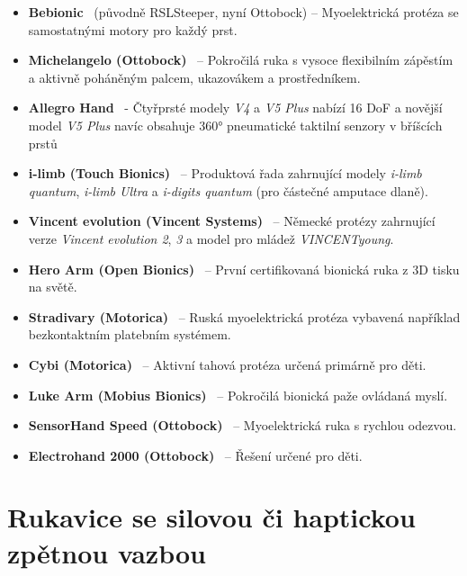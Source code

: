 \documentclass[FZS,DP]{tulthesis}
\begin{document}
\begin{itemize}
    \item \textbf{Bebionic}~\cite{Najman2017,Brazdil2020,Nyrobtseva2018,Thomas2023110,Ninu2014} (původně RSLSteeper, nyní Ottobock) – Myoelektrická protéza se samostatnými motory pro každý prst.
    \item \textbf{Michelangelo (Ottobock)}~\cite{Najman2017,Brazdil2020,Nyrobtseva2018,Ninu2014,Thomas2023110} – Pokročilá ruka s vysoce flexibilním zápěstím a aktivně poháněným palcem, ukazovákem a prostředníkem.
    \item \textbf{Allegro Hand}~\cite{Thomas2023110,Zhang2025,Mizrahi2023,GIUDICI2025,Li2025} - Čtyřprsté modely \textit{V4} a \textit{V5 Plus} nabízí 16 DoF a novější model \textit{V5 Plus} navíc obsahuje 360° pneumatické taktilní senzory v bříšcích prstů
    \item \textbf{i-limb (Touch Bionics)}~\cite{Najman2017,Brazdil2020,Nyrobtseva2018,Thomas2023110} – Produktová řada zahrnující modely \textit{i-limb quantum}, \textit{i-limb Ultra} a \textit{i-digits quantum} (pro částečné amputace dlaně).
    \item \textbf{Vincent evolution (Vincent Systems)}~\cite{Nyrobtseva2018,Thomas2023110} – Německé protézy zahrnující verze \textit{Vincent evolution 2}, \textit{3} a model pro mládež \textit{VINCENTyoung}.
    \item \textbf{Hero Arm (Open Bionics)}~\cite{Nyrobtseva2018,Koprnicky2019,Safran2022} – První certifikovaná bionická ruka z 3D tisku na světě.
    \item \textbf{Stradivary (Motorica)}~\cite{Nyrobtseva2018} – Ruská myoelektrická protéza vybavená například bezkontaktním platebním systémem.
    \item \textbf{Cybi (Motorica)}~\cite{Nyrobtseva2018} – Aktivní tahová protéza určená primárně pro děti.
    \item \textbf{Luke Arm (Mobius Bionics)}~\cite{Safran2022,Thomas2023110} – Pokročilá bionická paže ovládaná myslí.
    \item \textbf{SensorHand Speed (Ottobock)}~\cite{Thomas2023110,Brazdil2020} – Myoelektrická ruka s rychlou odezvou.
    \item \textbf{Electrohand 2000 (Ottobock)}~\cite{Nyrobtseva2018} – Řešení určené pro děti.
\end{itemize}

\section{Rukavice se silovou či haptickou zpětnou vazbou}
\end{document}
